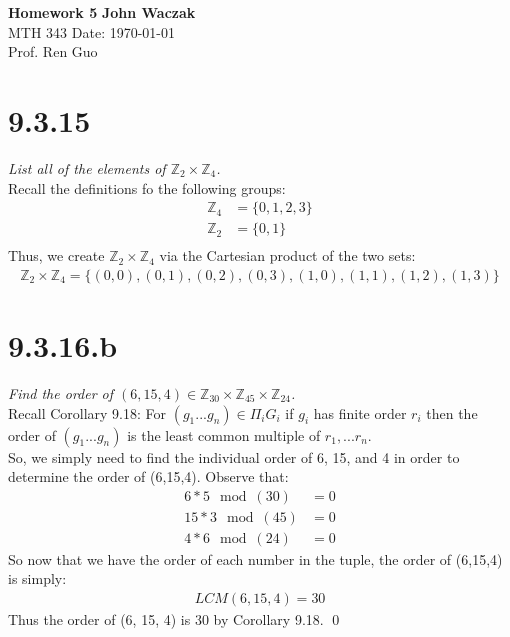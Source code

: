 \documentclass[a4paper, 11pt]{article}
\begin{document}
\noindent
\large\textbf{Homework 5} \hfill \textbf{John Waczak} \\
\normalsize MTH 343 \hfill  Date: \today \\
Prof. Ren Guo  \\

\section*{9.3.15}
\textit{List all of the elements of $\mathbb{Z}_2 \times \mathbb{Z}_4$.} \\ 

\noindent Recall the definitions fo the following groups: 
	\begin{align*}
		\mathbb{Z}_4 &= \{0, 1, 2, 3\} \\ 
		\mathbb{Z}_2 &= \{0, 1\} \\ 
	\end{align*}
Thus, we create $\mathbb{Z}_2 \times \mathbb{Z}_4$ via the Cartesian product of the two sets: 
	\begin{align}
		\mathbb{Z}_2 \times \mathbb{Z}_4 = \{(0,0), (0, 1), (0,2), (0,3), (1,0), (1,1),(1,2), (1,3)\}
	\end{align}

\section*{9.3.16.b}
\textit{Find the order of $(6,15,4) \in \mathbb{Z}_{30}\times\mathbb{Z}_{45}\times\mathbb{Z}_{24}$.}\\

\noindent Recall Corollary 9.18: For $(g_1...g_n)\in \Pi_i G_i$ if $g_i$ has finite order $r_i$ then the order of $(g_1...g_n)$ is the least common multiple of $r_1,...r_n$. \\ 

\noindent So, we simply need to find the individual order of 6, 15, and 4 in order to determine the order of (6,15,4). Observe that: 
	\begin{align*}
		 6*5 \mod (30) &= 0 \\
		15*3 \mod (45) &= 0 \\ 
		4*6 \mod (24) &= 0  
	\end{align*}
So now that we have the order of each number in the tuple, the order of (6,15,4) is simply: 
	\begin{eqnarray}
		LCM(6,15,4) = 30 
	\end{eqnarray}
Thus the order of (6, 15, 4) is 30 by Corollary 9.18. \qed
\end{document}
